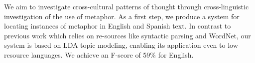 We aim to investigate cross-cultural patterns of thought through cross-linguistic investigation of the use of metaphor. As a first step, we
 produce a system for locating instances of metaphor in English and Spanish
 text. In contrast to previous work which relies on re-sources like syntactic
 parsing and WordNet, our system is based on LDA topic modeling, enabling its
 application even to low-resource languages. We achieve an F-score of 59\% for
 English.

